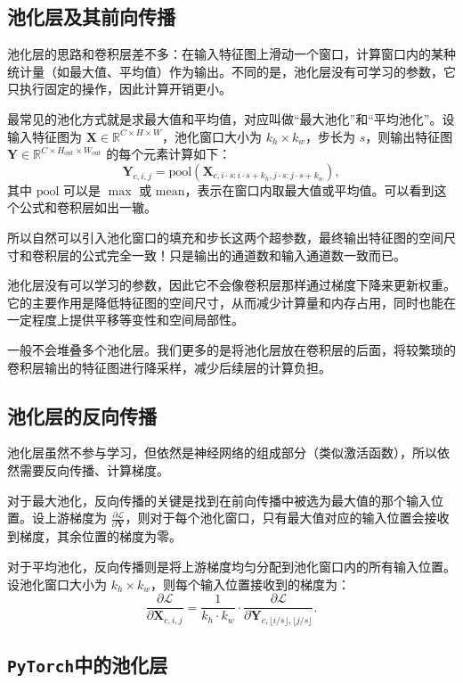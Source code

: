 \subsection{池化层及其前向传播}

池化层的思路和卷积层差不多：在输入特征图上滑动一个窗口，计算窗口内的某种统计量（如最大值、平均值）作为输出。不同的是，池化层没有可学习的参数，它只执行固定的操作，因此计算开销更小。

最常见的池化方式就是求最大值和平均值，对应叫做“最大池化”和“平均池化”。设输入特征图为 $\mathbf{X} \in \mathbb{R}^{C \times H \times W}$，池化窗口大小为 $k_h \times k_w$，步长为 $s$，则输出特征图 $\mathbf{Y} \in \mathbb{R}^{C \times H_{\text{out}} \times W_{\text{out}}}$ 的每个元素计算如下：
\[
\mathbf{Y}_{c,i,j} = \text{pool}\left(\mathbf{X}_{c, i \cdot s : i \cdot s + k_h, j \cdot s : j \cdot s + k_w}\right),
\]
其中 $\text{pool}$ 可以是 $\max$ 或 $\text{mean}$，表示在窗口内取最大值或平均值。可以看到这个公式和卷积层如出一辙。

所以自然可以引入池化窗口的填充和步长这两个超参数，最终输出特征图的空间尺寸和卷积层的公式完全一致！只是输出的通道数和输入通道数一致而已。

池化层没有可以学习的参数，因此它不会像卷积层那样通过梯度下降来更新权重。它的主要作用是降低特征图的空间尺寸，从而减少计算量和内存占用，同时也能在一定程度上提供平移等变性和空间局部性。

一般不会堆叠多个池化层。我们更多的是将池化层放在卷积层的后面，将较繁琐的卷积层输出的特征图进行降采样，减少后续层的计算负担。

\subsection{池化层的反向传播}

池化层虽然不参与学习，但依然是神经网络的组成部分（类似激活函数），所以依然需要反向传播、计算梯度。

对于最大池化，反向传播的关键是找到在前向传播中被选为最大值的那个输入位置。设上游梯度为 $\frac{\partial \mathcal{L}}{\partial \mathbf{Y}}$，则对于每个池化窗口，只有最大值对应的输入位置会接收到梯度，其余位置的梯度为零。

对于平均池化，反向传播则是将上游梯度均匀分配到池化窗口内的所有输入位置。设池化窗口大小为 $k_h \times k_w$，则每个输入位置接收到的梯度为：
\[
\frac{\partial \mathcal{L}}{\partial \mathbf{X}_{c, i, j}} = \frac{1}{k_h \cdot k_w} \cdot \frac{\partial \mathcal{L}}{\partial \mathbf{Y}_{c, \lfloor i/s \rfloor, \lfloor j/s \rfloor}}.
\]


\subsection{\texttt{PyTorch}中的池化层}


